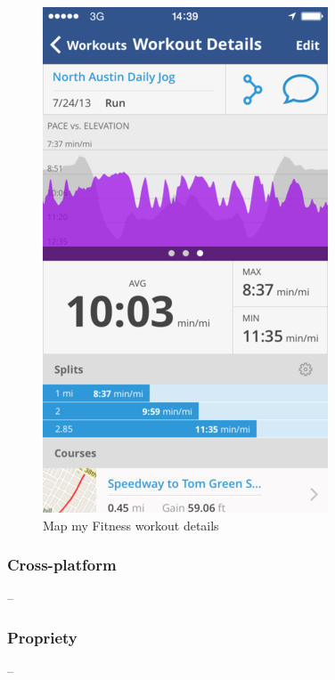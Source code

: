 \begin{figure}[h]
    \includegraphics[width=\textwidth]{Images/map-my-fitness-workout-details.jpeg}
    \caption{Map my Fitness workout details\cite{map-my-walk-img}}
\end{figure}


\subsubsection*{Cross-platform} -- 
\subsubsection*{Propriety} -- 
